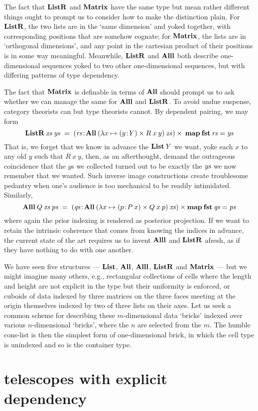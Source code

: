 \documentclass{article}
\begin{document}
The fact that $\mathbf{ListR}$ and $\mathbf{Matrix}$ have the same type but mean rather different things ought to prompt us to consider how to make the distinction plain. For $\mathbf{ListR}$, the two lists are in the `same dimension' and yoked together, with corresponding positions that are somehow cognate; for $\mathbf{Matrix}$, the lists are in `orthogonal dimensions', and any point in the cartesian product of their positions is in some way meaningful. Meanwhile, $\mathbf{ListR}$ and $\mathbf{Alll}$ both describe one-dimensional sequences yoked to two other one-dimensional sequences, but with differing patterns of type dependency.

The fact that $\mathbf{Matrix}$ is definable in terms of $\mathbf{All}$ should prompt us to ask whether we can manage the same for $\mathbf{Alll}$ and $\mathbf{ListR}$. To avoid undue suspense, category theorists can but type theorists cannot. By dependent pairing, we may form
\[
\mathbf{ListR}\:\mathit{xs}\:\mathit{ys} \;=\; (\mathit{rs}\!:\!\mathbf{All}\:(\lambda x\mapsto (y\!:\! Y)\times R\:x\:y)\:\mathit{xs})\times\:\mathbf{map}\:\mathbf{fst}\:\mathit{rs} = \mathit{ys}
\]
That is, we forget that we know in advance the $\mathbf{List}\:Y$ we want, yoke each $x$ to any old $y$ such that $R\:x\:y$, then, as an afterthought, demand the outrageous coincidence that the $y$s we collected turned out to be exactly the $\mathit{ys}$ we now remember that we wanted. Such inverse image constructions create troublesome pedantry when one's audience is too mechanical to be readily intimidated. Similarly,
\[
\mathbf{Alll}\:Q\:\mathit{xs}\:\mathit{ps} \;=\; (\mathit{qs}\!:\!\mathbf{All}\:(\lambda x\mapsto (p\!:\! P\:x)\times Q\:x\:p)\:\mathit{xs}) \times \mathbf{map}\:\mathbf{fst}\:\mathit{qs} = \mathit{ps}
\]
where again the prior indexing is rendered as posterior projection. If we want to retain the intrinsic coherence that comes from knowing the indices in advance, the current state of the art requires us to invent $\mathbf{Alll}$ and $\mathbf{ListR}$ afresh, as if they have nothing to do with one another.

We have seen five structures --- $\mathbf{List}$, $\mathbf{All}$, $\mathbf{Alll}$, $\mathbf{ListR}$ and $\mathbf{Matrix}$ --- but we might imagine many others, e.g., rectangular collections of cells where the length and height are not explicit in the type but their uniformity is enforced, or cuboids of data indexed by three matrices on the three faces meeting at the origin themselves indexed by two of three lists on their axes. Let us seek a common scheme for describing these $m$-dimensional data `bricks' indexed over various $n$-dimensional `bricks', where the $n$ are selected from the $m$. The humble cons-list is then the simplest form of one-dimensional brick, in which the cell type is unindexed and so is the container type.


\section{telescopes with explicit dependency}
\end{document}
